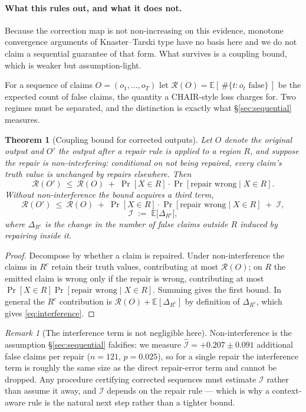 \documentclass[review,number,doubleblind]{elsarticle}
\theoremstyle{plain}
\newtheorem{theorem}{Theorem}
\theoremstyle{definition}
\theoremstyle{remark}
\newtheorem{remark}{Remark}
\newcommand{\Risk}{\mathcal{R}}
\newcommand{\E}{\mathbb{E}}
\newcommand{\Iota}{\mathcal{I}}
\begin{document}
\paragraph{What this rules out, and what it does not.}
Because the correction map is not non-increasing on this evidence, monotone convergence arguments
of Knaster--Tarski type have no basis here and we do not claim a sequential guarantee of that
form. What survives is a coupling bound, which is weaker but assumption-light.

For a sequence of claims $O=(o_1,\dots,o_T)$ let $\Risk(O)=\E[\,\#\{t:o_t\text{ false}\}\,]$
be the expected count of false claims, the quantity a CHAIR-style loss charges for. Two
regimes must be separated, and the distinction is exactly what \S\ref{sec:sequential}
measures.

\begin{theorem}[Coupling bound for corrected outputs]
\label{thm:coupling}
Let $O$ denote the original output and $O'$ the output after a repair rule is applied to a
region $R$, and suppose the repair is \emph{non-interfering}: conditional on not being
repaired, every claim's truth value is unchanged by repairs elsewhere. Then
\[
\Risk(O')\ \le\ \Risk(O)\;+\;\Pr[X\in R]\cdot\Pr[\text{repair wrong}\mid X\in R].
\]
Without non-interference the bound acquires a third term,
\begin{equation}
\label{eq:interference}
\Risk(O')\ \le\ \Risk(O)\;+\;\Pr[X\in R]\cdot\Pr[\text{repair wrong}\mid X\in R]\;+\;\Iota,
\end{equation}
\begin{equation*}
\Iota \;:=\; \E\big[\Delta_{R^c}\big],
\end{equation*}
where $\Delta_{R^c}$ is the change in the number of false claims outside $R$ induced by
repairing inside it.
\end{theorem}

\begin{proof}
Decompose by whether a claim is repaired. Under non-interference the claims in $R^c$ retain
their truth values, contributing at most $\Risk(O)$; on $R$ the emitted claim is wrong only
if the repair is wrong, contributing at most
$\Pr[X\in R]\Pr[\text{repair wrong}\mid X\in R]$. Summing gives the first bound. In general
the $R^c$ contribution is $\Risk(O)+\E[\Delta_{R^c}]$ by definition of $\Delta_{R^c}$, which
gives \eqref{eq:interference}.
\end{proof}

\begin{remark}[The interference term is not negligible here]
\label{rem:interference}
Non-interference is the assumption \S\ref{sec:sequential} falsifies: we measure
$\widehat{\Iota}=+0.207\pm0.091$ additional false claims per repair ($n=121$, $p=0.025$), so
for a single repair the interference term is roughly the same size as the direct repair-error
term and cannot be dropped. Any procedure certifying corrected sequences must estimate
$\Iota$ rather than assume it away, and $\Iota$ depends on the repair rule --- which is why
a context-aware rule is the natural next step rather than a tighter bound.
\end{remark}
\end{document}
